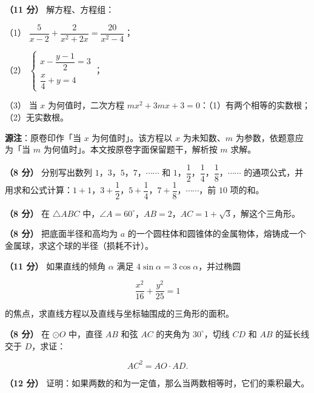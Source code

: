 \begin{question}
\textbf{（11 分）} 解方程、方程组：

（1） $\dfrac{5}{x-2}+\dfrac{2}{x^2+2x}=\dfrac{20}{x^2-4}$；

（2） $\begin{cases} x-\dfrac{y-1}{2}=3 \\ \dfrac{x}{4}+y=4 \end{cases}$；

（3） 当 $x$ 为何值时，二次方程 $mx^2+3mx+3=0$：（1）有两个相等的实数根；（2）无实数根。

\begin{gktip}
\textbf{源注}：原卷印作「当 $x$ 为何值时」。该方程以 $x$ 为未知数、$m$ 为参数，依题意应为「当 $m$ 为何值时」。本文按原卷字面保留题干，解析按 $m$ 求解。
\end{gktip}

\end{question}
\begin{question}
\textbf{（8 分）} 分别写出数列 $1$，$3$，$5$，$7$，$\cdots\cdots$ 和 $1$，$\dfrac12$，$\dfrac14$，$\dfrac18$，$\cdots\cdots$ 的通项公式，并用求和公式计算：$1+1$，$3+\dfrac12$，$5+\dfrac14$，$7+\dfrac18$，$\cdots\cdots$，前 $10$ 项的和。

\end{question}
\begin{question}
\textbf{（8 分）} 在 $\triangle ABC$ 中，$\angle A=60^\circ$，$AB=2$，$AC=1+\sqrt3$，解这个三角形。

\end{question}
\begin{question}
\textbf{（8 分）} 把底面半径和高均为 $a$ 的一个圆柱体和圆锥体的金属物体，熔铸成一个金属球，求这个球的半径（损耗不计）。

\end{question}
\begin{question}
\textbf{（11 分）} 如果直线的倾角 $\alpha$ 满足 $4\sin\alpha=3\cos\alpha$，并过椭圆

\nopagebreak[4]
\[
\frac{x^2}{16}+\frac{y^2}{25}=1
\]

的焦点，求直线方程以及直线与坐标轴围成的三角形的面积。

\Needspace{0.4\textheight}
\end{question}
\begin{question}
\textbf{（8 分）} 在 $\odot O$ 中，直径 $AB$ 和弦 $AC$ 的夹角为 $30^\circ$，切线 $CD$ 和 $AB$ 的延长线交于 $D$，求证：

\nopagebreak[4]
\[
AC^2=AO\cdot AD.
\]
\nopagebreak[4]
\begin{center}\end{center}
\nopagebreak[4]
\end{question}
\begin{question}
\textbf{（12 分）} 证明：如果两数的和为一定值，那么当两数相等时，它们的乘积最大。

\end{question}